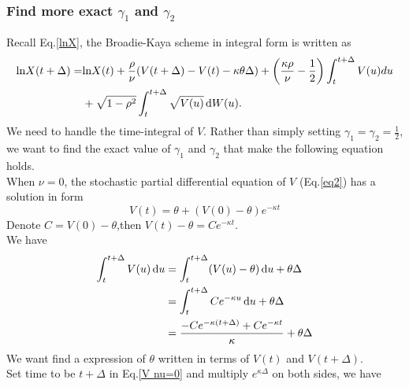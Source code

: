 \documentclass{ws-ijfe}
\begin{document}
\subsubsection{Find more exact $\gamma_1$ and $\gamma_2$}
Recall Eq.\eqref{lnX}, the Broadie-Kaya scheme in integral form is written as
\begin{equation*}
\begin{split}
    \text{ln}X(t+\Delta)=&\text{ln}X(t)+\frac{\rho}{\nu}(V(t+\Delta)-V(t)-\kappa\theta\Delta)+\bigg(\frac{\kappa\rho}{\nu}-\frac{1}{2}\bigg)\int_{t}^{t+\Delta} V(u)du\\
     &+\sqrt{1-\rho^2}\int_{t}^{t+\Delta}\sqrt{V(u)}\,\mathrm{d} W(u).
\end{split}
\end{equation*}
We need to handle the time-integral of $V$. Rather than simply setting $\gamma_1=\gamma_2=\frac{1}{2}$, we want to find the exact value of $\gamma_1$ and $\gamma_2$ that make the following equation holds.\\
When $\nu=0$, the stochastic partial differential equation of $V$ (Eq.\eqref{eq2}) has a solution in form
\begin{equation}\label{V nu=0}
  V(t)=\theta + (V(0)-\theta)e^{-\kappa t}
\end{equation}
Denote $C=V(0)-\theta$,then $V(t)-\theta= Ce^{-\kappa t}$.\\
We have
\begin{equation}\label{int V}
  \begin{split}
    \int_{t}^{t+\Delta}V(u)\,\d u&= \int_{t}^{t+\Delta}(V(u)-\theta)\,\d u+\theta\Delta\\
    &=\int_{t}^{t+\Delta}Ce^{-\kappa u}\,\d u +\theta\Delta\\
    &=\frac{-Ce^{-\kappa(t+\Delta)}+Ce^{-\kappa t}}{\kappa}+\theta\Delta\\
  \end{split}
\end{equation}
We want find a expression of $\theta$ written in terms of $V(t)$ and $V(t+\Delta)$.\\
Set time to be $t+\Delta$ in Eq.\eqref{V nu=0} and multiply $e^{\kappa\Delta}$ on both sides, we have
\end{document}
